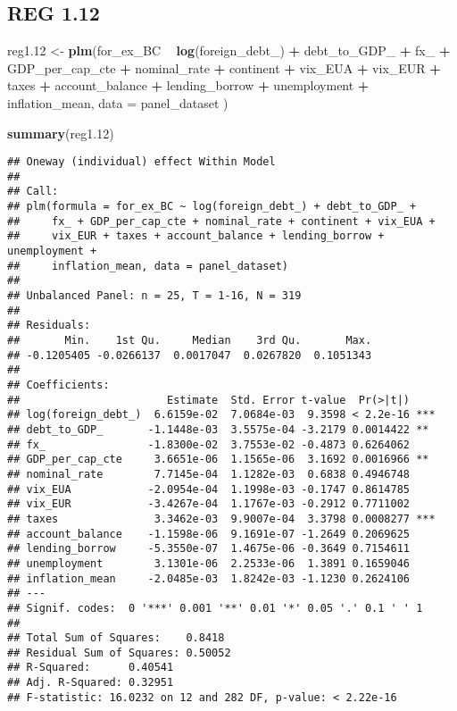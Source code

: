 \documentclass[]{article}
\newenvironment{Shaded}{\begin{snugshade}}{\end{snugshade}}
\newcommand{\KeywordTok}[1]{\textcolor[rgb]{0.13,0.29,0.53}{\textbf{#1}}}
\newcommand{\DataTypeTok}[1]{\textcolor[rgb]{0.13,0.29,0.53}{#1}}
\newcommand{\DecValTok}[1]{\textcolor[rgb]{0.00,0.00,0.81}{#1}}
\newcommand{\StringTok}[1]{\textcolor[rgb]{0.31,0.60,0.02}{#1}}
\newcommand{\OperatorTok}[1]{\textcolor[rgb]{0.81,0.36,0.00}{\textbf{#1}}}
\newcommand{\NormalTok}[1]{#1}
\begin{document}
\subsection{REG 1.12}\label{reg-1.12}

\begin{Shaded}
\begin{Highlighting}[]
\NormalTok{reg1.}\DecValTok{12}\NormalTok{ <-}\StringTok{ }\KeywordTok{plm}\NormalTok{(for_ex_BC }\OperatorTok{~}\StringTok{ }\KeywordTok{log}\NormalTok{(foreign_debt_) }\OperatorTok{+}\StringTok{ }\NormalTok{debt_to_GDP_ }\OperatorTok{+}\StringTok{ }\NormalTok{fx_ }\OperatorTok{+}\StringTok{ }\NormalTok{GDP_per_cap_cte }\OperatorTok{+}\StringTok{ }\NormalTok{nominal_rate }\OperatorTok{+}\StringTok{ }\NormalTok{continent }\OperatorTok{+}\StringTok{ }\NormalTok{vix_EUA }\OperatorTok{+}\StringTok{ }\NormalTok{vix_EUR }\OperatorTok{+}\StringTok{ }\NormalTok{taxes }\OperatorTok{+}\StringTok{ }\NormalTok{account_balance }\OperatorTok{+}\StringTok{ }\NormalTok{lending_borrow }\OperatorTok{+}\StringTok{ }\NormalTok{unemployment }\OperatorTok{+}\StringTok{ }\NormalTok{inflation_mean, }\DataTypeTok{data =}\NormalTok{ panel_dataset )}

\KeywordTok{summary}\NormalTok{(reg1.}\DecValTok{12}\NormalTok{)}
\end{Highlighting}
\end{Shaded}

\begin{verbatim}
## Oneway (individual) effect Within Model
## 
## Call:
## plm(formula = for_ex_BC ~ log(foreign_debt_) + debt_to_GDP_ + 
##     fx_ + GDP_per_cap_cte + nominal_rate + continent + vix_EUA + 
##     vix_EUR + taxes + account_balance + lending_borrow + unemployment + 
##     inflation_mean, data = panel_dataset)
## 
## Unbalanced Panel: n = 25, T = 1-16, N = 319
## 
## Residuals:
##       Min.    1st Qu.     Median    3rd Qu.       Max. 
## -0.1205405 -0.0266137  0.0017047  0.0267820  0.1051343 
## 
## Coefficients:
##                       Estimate  Std. Error t-value  Pr(>|t|)    
## log(foreign_debt_)  6.6159e-02  7.0684e-03  9.3598 < 2.2e-16 ***
## debt_to_GDP_       -1.1448e-03  3.5575e-04 -3.2179 0.0014422 ** 
## fx_                -1.8300e-02  3.7553e-02 -0.4873 0.6264062    
## GDP_per_cap_cte     3.6651e-06  1.1565e-06  3.1692 0.0016966 ** 
## nominal_rate        7.7145e-04  1.1282e-03  0.6838 0.4946748    
## vix_EUA            -2.0954e-04  1.1998e-03 -0.1747 0.8614785    
## vix_EUR            -3.4267e-04  1.1767e-03 -0.2912 0.7711002    
## taxes               3.3462e-03  9.9007e-04  3.3798 0.0008277 ***
## account_balance    -1.1598e-06  9.1691e-07 -1.2649 0.2069625    
## lending_borrow     -5.3550e-07  1.4675e-06 -0.3649 0.7154611    
## unemployment        3.1301e-06  2.2533e-06  1.3891 0.1659046    
## inflation_mean     -2.0485e-03  1.8242e-03 -1.1230 0.2624106    
## ---
## Signif. codes:  0 '***' 0.001 '**' 0.01 '*' 0.05 '.' 0.1 ' ' 1
## 
## Total Sum of Squares:    0.8418
## Residual Sum of Squares: 0.50052
## R-Squared:      0.40541
## Adj. R-Squared: 0.32951
## F-statistic: 16.0232 on 12 and 282 DF, p-value: < 2.22e-16
\end{verbatim}
\end{document}
